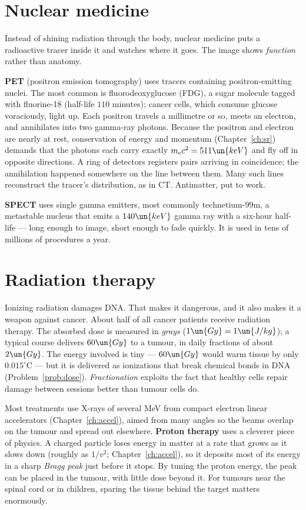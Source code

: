 \section{Nuclear medicine}

Instead of shining radiation through the body, nuclear medicine puts a radioactive tracer inside it and watches where it goes. The image shows \emph{function} rather than anatomy.

\textbf{PET} (positron emission tomography) uses tracers containing positron-emitting nuclei. The most common is fluorodeoxyglucose (FDG), a sugar molecule tagged with fluorine-18 (half-life $110$ minutes); cancer cells, which consume glucose voraciously, light up. Each positron travels a millimetre or so, meets an electron, and annihilates into two gamma-ray photons. Because the positron and electron are nearly at rest, conservation of energy and momentum (Chapter~\ref{ch:sr}) demands that the photons each carry exactly $m_ec^2 = 511\un{keV}$ and fly off in opposite directions. A ring of detectors registers pairs arriving in coincidence; the annihilation happened somewhere on the line between them. Many such lines reconstruct the tracer's distribution, as in CT. Antimatter, put to work.

\textbf{SPECT} uses single gamma emitters, most commonly technetium-99m, a metastable nucleus that emits a $140\un{keV}$ gamma ray with a six-hour half-life --- long enough to image, short enough to fade quickly. It is used in tens of millions of procedures a year.

\section{Radiation therapy}

Ionizing radiation damages DNA. That makes it dangerous, and it also makes it a weapon against cancer. About half of all cancer patients receive radiation therapy. The absorbed dose is measured in \emph{grays} ($1\un{Gy} = 1\un{J/kg}$); a typical course delivers $60\un{Gy}$ to a tumour, in daily fractions of about $2\un{Gy}$. The energy involved is tiny --- $60\un{Gy}$ would warm tissue by only $0.015^\circ\text{C}$ --- but it is delivered as ionizations that break chemical bonds in DNA (Problem~\ref{prob:dose}). \emph{Fractionation} exploits the fact that healthy cells repair damage between sessions better than tumour cells do.

Most treatments use X-rays of several MeV from compact electron linear accelerators (Chapter~\ref{ch:accel}), aimed from many angles so the beams overlap on the tumour and spread out elsewhere. \textbf{Proton therapy} uses a cleverer piece of physics. A charged particle loses energy in matter at a rate that grows as it slows down (roughly as $1/v^2$; Chapter~\ref{ch:accel}), so it deposits most of its energy in a sharp \emph{Bragg peak} just before it stops. By tuning the proton energy, the peak can be placed in the tumour, with little dose beyond it. For tumours near the spinal cord or in children, sparing the tissue behind the target matters enormously.

